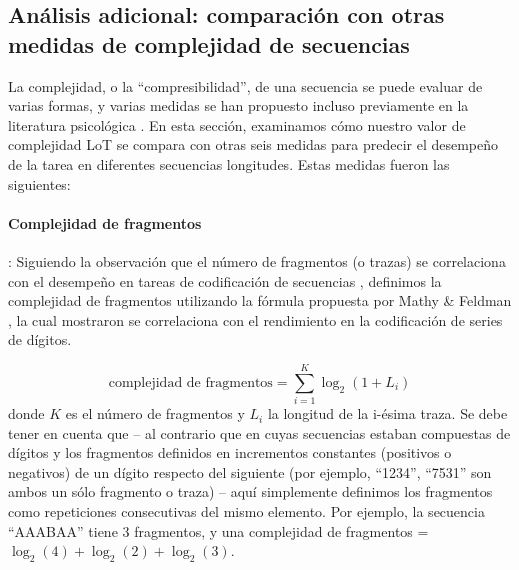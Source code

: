 \subsection{Análisis adicional: comparación con otras medidas de complejidad de secuencias}


La complejidad, o la ``compresibilidad'', de una secuencia se puede evaluar de varias formas, y varias medidas se han propuesto incluso previamente en la literatura psicológica \cite{f17,f30,f34,f41,f44,f95,f96,f97,f98}. En esta sección, examinamos cómo nuestro valor de complejidad LoT se compara con otras seis medidas para predecir el desempeño de la tarea en diferentes secuencias longitudes. Estas medidas fueron las siguientes:


\paragraph{Complejidad de fragmentos}: Siguiendo la observación que el número de fragmentos (o trazas) se correlaciona con el desempeño en tareas de codificación de secuencias \cite{f34}, definimos la complejidad de fragmentos utilizando la fórmula propuesta por Mathy \& Feldman \cite{f34}, la cual mostraron se correlaciona con el rendimiento en la codificación de series de dígitos. 

$$ \text{complejidad de fragmentos} = \sum_{i = 1}^{K} \log_2(1+L_i) $$ donde $K$ es el número de fragmentos y $L_i$ la longitud de la i-ésima traza. Se debe tener en cuenta que -- al contrario que en \cite{f34} cuyas secuencias estaban compuestas de dígitos y los fragmentos definidos en incrementos constantes (positivos o negativos) de un dígito respecto del siguiente (por ejemplo, ``1234'', ``7531'' son ambos un sólo fragmento o traza) -- aquí simplemente definimos los fragmentos como repeticiones consecutivas del mismo elemento. Por ejemplo, la secuencia ``AAABAA'' tiene 3 fragmentos, y una complejidad de fragmentos = $\log_2(4) + \log_2(2) + \log_2(3)$.


